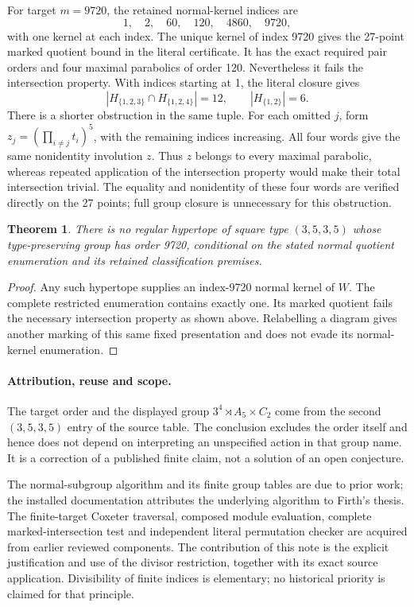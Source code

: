 \documentclass[11pt]{article}
\newtheorem{theorem}{Theorem}\newtheorem{lemma}[theorem]{Lemma}
\begin{document}
For target $m=9720$, the retained normal-kernel indices are
\[
 1,\quad 2,\quad 60,\quad 120,\quad 4860,\quad 9720,
\]
with one kernel at each index. The unique kernel of index 9720 gives the
27-point marked quotient bound in the literal certificate. It has the
exact required pair orders and four maximal parabolics of order 120.
Nevertheless it fails the intersection property. With indices starting
at 1, the literal closure gives
\[
 |H_{\{1,2,3\}}\cap H_{\{1,2,4\}}|=12,
 \qquad |H_{\{1,2\}}|=6.
\]
There is a shorter obstruction in the same tuple. For each omitted $j$,
form $z_j=(\prod_{i\ne j}t_i)^5$, with the remaining indices increasing.
All four words give the same nonidentity involution $z$. Thus $z$ belongs
to every maximal parabolic, whereas repeated application of the
intersection property would make their total intersection trivial.
The equality and nonidentity of these four words are verified directly
on the 27 points; full group closure is unnecessary for this obstruction.

\begin{theorem}
There is no regular hypertope of square type $(3,5,3,5)$ whose
type-preserving group has order 9720, conditional on the stated normal
quotient enumeration and its retained classification premises.
\end{theorem}
\begin{proof}
Any such hypertope supplies an index-9720 normal kernel of $W$. The
complete restricted enumeration contains exactly one. Its marked quotient
fails the necessary intersection property as shown above. Relabelling
a diagram gives another marking of this same fixed presentation and
does not evade its normal-kernel enumeration.
\end{proof}

\newpage
\paragraph{Attribution, reuse and scope.}
The target order and the displayed group $3^4\rtimes A_5\times C_2$
come from the second $(3,5,3,5)$ entry of the source table. The conclusion
excludes the order itself and hence does not depend on interpreting an
unspecified action in that group name. It is a correction of a published
finite claim, not a solution of an open conjecture.

The normal-subgroup algorithm and its finite group tables are due to
prior work; the installed documentation attributes the underlying
algorithm to Firth's thesis. The finite-target Coxeter traversal, composed
module evaluation, complete marked-intersection test and independent
literal permutation checker are acquired from earlier reviewed components.
The contribution of this note is the explicit justification and use of
the divisor restriction, together with its exact source application.
Divisibility of finite indices is elementary; no historical priority is
claimed for that principle.
\end{document}
